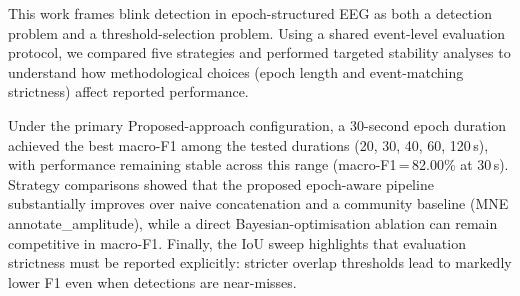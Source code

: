 
This work frames blink detection in epoch-structured EEG as both a detection problem and a
threshold-selection problem. Using a shared event-level evaluation protocol, we compared
five strategies and performed targeted stability analyses to understand how methodological
choices (epoch length and event-matching strictness) affect reported performance.

Under the primary Proposed-approach configuration, a 30-second epoch duration achieved the best
macro-F1 among the tested durations (20, 30, 40, 60, 120\,s), with performance remaining
stable across this range (macro-F1\,=\,82.00\% at 30\,s). Strategy comparisons showed
that the proposed epoch-aware pipeline substantially improves over naive concatenation and
a community baseline (MNE annotate\_amplitude), while a direct Bayesian-optimisation
ablation can remain competitive in macro-F1. Finally, the IoU sweep highlights that
evaluation strictness must be reported explicitly: stricter overlap thresholds lead to
markedly lower F1 even when detections are near-misses.
